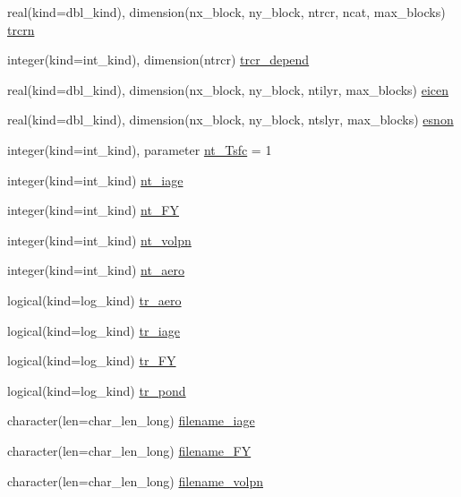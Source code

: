 \begin{DoxyCompactItemize}
\item 
real(kind=dbl\_\-kind), dimension(nx\_\-block, ny\_\-block, ntrcr, ncat, max\_\-blocks) \hyperlink{namespaceice__state_a52d1c7e6719d1a295a7e5fab8b867dd1}{trcrn}
\item 
integer(kind=int\_\-kind), dimension(ntrcr) \hyperlink{namespaceice__state_a1690af0ac3de6ba93723f9eeab0dfe3f}{trcr\_\-depend}
\item 
real(kind=dbl\_\-kind), dimension(nx\_\-block, ny\_\-block, ntilyr, max\_\-blocks) \hyperlink{namespaceice__state_ae98b075caabb73fcd86ce51eb76849b4}{eicen}
\item 
real(kind=dbl\_\-kind), dimension(nx\_\-block, ny\_\-block, ntslyr, max\_\-blocks) \hyperlink{namespaceice__state_aeb23ce1b6f981d016e447371d318a10c}{esnon}
\item 
integer(kind=int\_\-kind), parameter \hyperlink{namespaceice__state_a40b462400c0ddbc648e6aa0dd6a417b7}{nt\_\-Tsfc} = 1
\item 
integer(kind=int\_\-kind) \hyperlink{namespaceice__state_aeae23c004739caada7b1be2f39df0927}{nt\_\-iage}
\item 
integer(kind=int\_\-kind) \hyperlink{namespaceice__state_a346a7cc45c174f3f489ba2e253bcf86f}{nt\_\-FY}
\item 
integer(kind=int\_\-kind) \hyperlink{namespaceice__state_afd23d1c712e37876224466b8f6b41c9a}{nt\_\-volpn}
\item 
integer(kind=int\_\-kind) \hyperlink{namespaceice__state_a17498b6cf9c7353f2704a5cd0b579718}{nt\_\-aero}
\item 
logical(kind=log\_\-kind) \hyperlink{namespaceice__state_a9a5f93f07c79fa1b586dbd336420fbfa}{tr\_\-aero}
\item 
logical(kind=log\_\-kind) \hyperlink{namespaceice__state_adad96297f8eb0305b0e5ed4db6e6fbd3}{tr\_\-iage}
\item 
logical(kind=log\_\-kind) \hyperlink{namespaceice__state_a086ac953805c6da5789990b53cb6b662}{tr\_\-FY}
\item 
logical(kind=log\_\-kind) \hyperlink{namespaceice__state_a56887007a4f4de6dd85325f308b9be48}{tr\_\-pond}
\item 
character(len=char\_\-len\_\-long) \hyperlink{namespaceice__state_ab39a4eb6530af3e7ded38f9876ddea95}{filename\_\-iage}
\item 
character(len=char\_\-len\_\-long) \hyperlink{namespaceice__state_ab81811ccfe7c4d81a224263818d7622a}{filename\_\-FY}
\item 
character(len=char\_\-len\_\-long) \hyperlink{namespaceice__state_a56846a6e162a564a78e7ad6d8103aa19}{filename\_\-volpn}

\end{DoxyCompactItemize}
